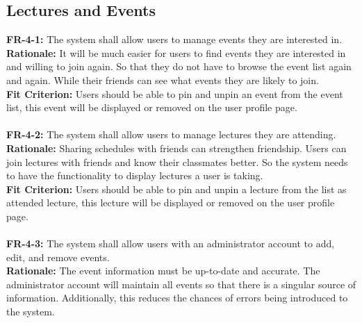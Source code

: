 \documentclass[12pt]{article}
\begin{document}
\subsection{Lectures and Events}
    \textbf{FR-4-1:} The system shall allow users to manage events they are interested in.\\
    \textbf{Rationale:} It will be much easier for users to find events they are interested in and willing to join again. So that they do not have to browse the event list again and again. While their friends can see what events they are likely to join.\\
    \textbf{Fit Criterion:} Users should be able to pin and unpin an event from the event list, this event will be displayed or removed on the user profile page.\\\\
    \textbf{FR-4-2:} The system shall allow users to manage lectures they are attending.\\
    \textbf{Rationale:} Sharing schedules with friends can strengthen friendship. Users can join lectures with friends and know their classmates better. So the system needs to have the functionality to display lectures a user is taking.\\
    \textbf{Fit Criterion:} Users should be able to pin and unpin a lecture from the list as attended lecture, this lecture will be displayed or removed on the user profile page.\\\\
    \textbf{FR-4-3:} The system shall allow users with an administrator account to add, edit, and remove events.\\
    \textbf{Rationale:} The event information must be up-to-date and accurate. The administrator account will maintain all events so that there is a singular source of information. Additionally, this reduces the chances of errors being introduced to the system.\\
\end{document}
